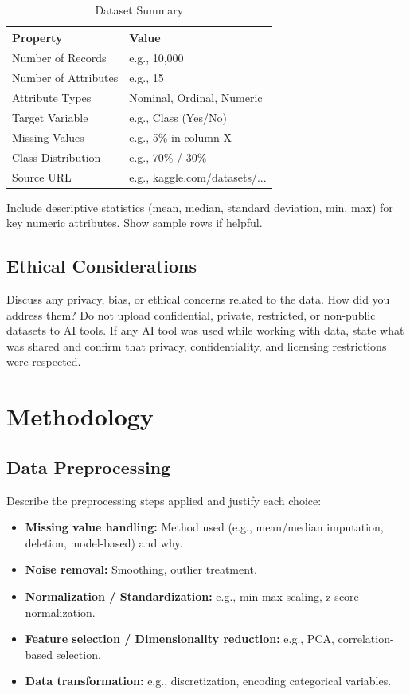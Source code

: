 \documentclass[conference]{IEEEtran}
\begin{document}
	\begin{table}[htbp]
		\caption{Dataset Summary}
		\begin{center}
			\begin{tabular}{|l|l|}
				\hline
				\textbf{Property} & \textbf{Value} \\
				\hline
				Number of Records & e.g., 10,000 \\
				\hline
				Number of Attributes & e.g., 15 \\
				\hline
				Attribute Types & Nominal, Ordinal, Numeric \\
				\hline
				Target Variable & e.g., Class (Yes/No) \\
				\hline
				Missing Values & e.g., 5\% in column X \\
				\hline
				Class Distribution & e.g., 70\% / 30\% \\
				\hline
				Source URL & e.g., kaggle.com/datasets/... \\
				\hline
			\end{tabular}
			\label{tab:dataset}
		\end{center}
	\end{table}
	
	Include descriptive statistics (mean, median, standard deviation, min, max) for key numeric attributes. Show sample rows if helpful.
	
	\subsection{Ethical Considerations}
	Discuss any privacy, bias, or ethical concerns related to the data. How did you address them? Do not upload confidential, private, restricted, or non-public datasets to AI tools. If any AI tool was used while working with data, state what was shared and confirm that privacy, confidentiality, and licensing restrictions were respected.
	
	\section{Methodology}
	\label{sec:methodology}
	
	\subsection{Data Preprocessing}
	Describe the preprocessing steps applied and justify each choice:
	\begin{itemize}
		\item \textbf{Missing value handling:} Method used (e.g., mean/median imputation, deletion, model-based) and why.
		\item \textbf{Noise removal:} Smoothing, outlier treatment.
		\item \textbf{Normalization / Standardization:} e.g., min-max scaling, z-score normalization.
		\item \textbf{Feature selection / Dimensionality reduction:} e.g., PCA, correlation-based selection.
		\item \textbf{Data transformation:} e.g., discretization, encoding categorical variables.
	\end{itemize}
	
\end{document}
